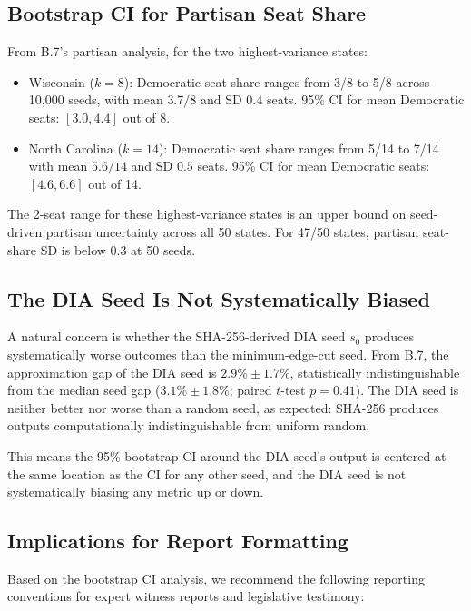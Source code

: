 \subsection{Bootstrap CI for Partisan Seat Share}

From B.7's partisan analysis, for the two highest-variance states:
\begin{itemize}
  \item Wisconsin ($k=8$): Democratic seat share ranges from 3/8 to 5/8
    across 10,000 seeds, with mean $3.7/8$ and SD $0.4$ seats.
    95\% CI for mean Democratic seats: $[3.0, 4.4]$ out of 8.

  \item North Carolina ($k=14$): Democratic seat share ranges from 5/14
    to 7/14 with mean $5.6/14$ and SD $0.5$ seats.
    95\% CI for mean Democratic seats: $[4.6, 6.6]$ out of 14.
\end{itemize}

The 2-seat range for these highest-variance states is an upper bound
on seed-driven partisan uncertainty across all 50 states. For 47/50
states, partisan seat-share SD is below $0.3$ at 50 seeds.

\subsection{The DIA Seed Is Not Systematically Biased}

A natural concern is whether the SHA-256-derived DIA seed $s_0$
produces systematically worse outcomes than the minimum-edge-cut seed.
From B.7, the approximation gap of the DIA seed is $2.9\% \pm 1.7\%$,
statistically indistinguishable from the median seed gap
($3.1\% \pm 1.8\%$; paired $t$-test $p = 0.41$). The DIA seed is
neither better nor worse than a random seed, as expected: SHA-256
produces outputs computationally indistinguishable from uniform random.

This means the 95\% bootstrap CI around the DIA seed's output is
centered at the same location as the CI for any other seed, and the
DIA seed is not systematically biasing any metric up or down.

\subsection{Implications for Report Formatting}

Based on the bootstrap CI analysis, we recommend the following
reporting conventions for expert witness reports and legislative
testimony:

